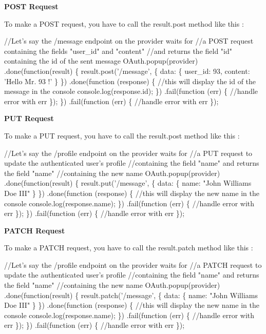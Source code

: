 {\bfseries P\+O\+ST Request}

To make a P\+O\+ST request, you have to call the {\ttfamily result.\+post} method like this \+:


\begin{DoxyCode}
//Let's say the /message endpoint on the provider waits for
//a POST request containing the fields "user\_id" and "content"
//and returns the field "id" containing the id of the sent message 
OAuth.popup(provider)
.done(function(result) \{
    result.post('/message', \{
        data: \{
            user\_id: 93,
            content: 'Hello Mr. 93 !'
        \}
    \})
    .done(function (response) \{
        //this will display the id of the message in the console
        console.log(response.id);
    \})
    .fail(function (err) \{
        //handle error with err
    \});
\})
.fail(function (err) \{
    //handle error with err
\});
\end{DoxyCode}


{\bfseries P\+UT Request}

To make a P\+UT request, you have to call the {\ttfamily result.\+post} method like this \+:


\begin{DoxyCode}
//Let's say the /profile endpoint on the provider waits for
//a PUT request to update the authenticated user's profile 
//containing the field "name" and returns the field "name" 
//containing the new name
OAuth.popup(provider)
.done(function(result) \{
    result.put('/message', \{
        data: \{
            name: "John Williams Doe III"
        \}
    \})
    .done(function (response) \{
        //this will display the new name in the console
        console.log(response.name);
    \})
    .fail(function (err) \{
        //handle error with err
    \});
\})
.fail(function (err) \{
    //handle error with err
\});
\end{DoxyCode}


{\bfseries P\+A\+T\+CH Request}

To make a P\+A\+T\+CH request, you have to call the {\ttfamily result.\+patch} method like this \+:


\begin{DoxyCode}
//Let's say the /profile endpoint on the provider waits for
//a PATCH request to update the authenticated user's profile 
//containing the field "name" and returns the field "name" 
//containing the new name
OAuth.popup(provider)
.done(function(result) \{
    result.patch('/message', \{
        data: \{
            name: "John Williams Doe III"
        \}
    \})
    .done(function (response) \{
        //this will display the new name in the console
        console.log(response.name);
    \})
    .fail(function (err) \{
        //handle error with err
    \});
\})
.fail(function (err) \{
    //handle error with err
\});
\end{DoxyCode}


